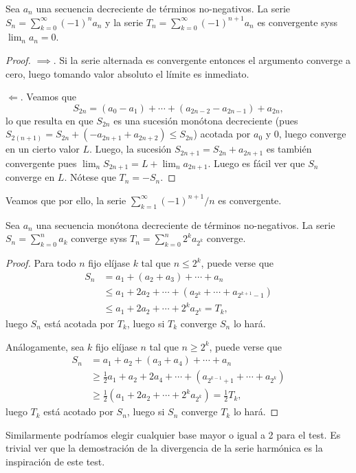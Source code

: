 \documentclass[11pt,oneside,a4paper]{book}
\begin{document}
\begin{thm}
Sea $a_n$ una secuencia decreciente de términos no-negativos. La serie $S_n=\sum_{k=0}^\infty(-1)^na_n$ y la serie $T_n=\sum_{k=0}^\infty(-1)^{n+1}a_n$ es convergente syss $\lim_n a_n=0$.
\end{thm}
\begin{proof}
$\implies$. Si la serie alternada es convergente entonces el argumento converge a cero, luego tomando valor absoluto el límite es inmediato.

$\Longleftarrow$. Veamos que
$$S_{2n}=(a_0-a_1)+\cdots+(a_{2n-2}-a_{2n-1})+a_{2n},$$
lo que resulta en que $S_{2n}$ es una sucesión monótona decreciente (pues $S_{2(n+1)}=S_{2n}+(-a_{2n+1}+a_{2n+2})\leq S_{2n}$) acotada por $a_0$ y 0, luego converge en un cierto valor $L$. Luego, la sucesión $S_{2n+1}=S_{2n}+a_{2n+1}$ es también convergente pues $\lim_n S_{2n+1}=L+\lim_n a_{2n+1}$. Luego es fácil ver que $S_n$ converge en $L$. Nótese que $T_n=-S_n$.
\end{proof}
Veamos que por ello, la serie $\sum_{k=1}^\infty (-1)^{n+1}/n$ es convergente.
\begin{thm}
Sea $a_n$ una secuencia monótona decreciente de términos no-negativos. La serie $S_n=\sum_{k=0}^n a_k$ converge syss $T_n=\sum_{k=0}^n 2^ka_{2^k}$ converge.
\end{thm}
\begin{proof}
Para todo $n$ fijo elíjase $k$ tal que $n\leq 2^k$, puede verse que
\begin{align*}
S_n&=a_1+(a_2+a_3)+\cdots+a_n\\
&\leq a_1+2a_2+\cdots+(a_{2^k}+\cdots+a_{2^{k+1}-1})\\
&\leq a_1+2a_2+\cdots+2^ka_{2^k}=T_k,
\end{align*}
luego $S_n$ está acotada por $T_k$, luego si $T_k$ converge $S_n$ lo hará.

Análogamente, sea $k$ fijo elíjase $n$ tal que $n\geq 2^k$, puede verse que
\begin{align*}
S_n&=a_1+a_2+(a_3+a_4)+\cdots+a_n\\
&\geq\frac 12a_1+a_2+2a_4+\cdots+(a_{2^{k-1}+1}+\cdots+a_{2^k})\\
&\geq\frac 12(a_1+2a_2+\cdots+2^ka_{2^k})=\frac 12T_k,
\end{align*}
luego $T_k$ está acotado por $S_n$, luego si $S_n$ converge $T_k$ lo hará.
\end{proof}
Similarmente podríamos elegir cualquier base mayor o igual a 2 para el test. Es trivial ver que la demostración de la divergencia de la serie harmónica es la inspiración de este test.
\end{document}
